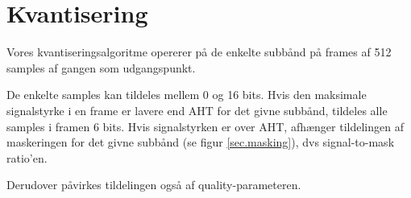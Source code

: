 \section{Kvantisering}
\label{sec.quantization}
Vores kvantiseringsalgoritme opererer på de enkelte subbånd på frames af 512 samples af gangen som udgangspunkt.

De enkelte samples kan tildeles mellem 0 og 16 bits. Hvis den maksimale signalstyrke i en frame er lavere end AHT for det givne subbånd, tildeles alle samples i framen 6 bits. Hvis signalstyrken er over AHT, afhænger tildelingen af maskeringen for det givne subbånd (se figur \ref{sec.masking}), dvs signal-to-mask ratio'en.

Derudover påvirkes tildelingen også af quality-parameteren.
